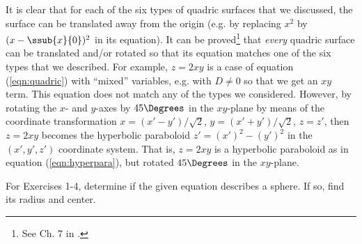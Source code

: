It is clear that for each of the six types of quadric surfaces that we discussed, the surface can be translated away
from the origin (e.g. by replacing $x^2$ by $(x - \ssub{x}{0})^2$ in its equation). It can be proved\footnote{See
Ch. 7 in \cite{pog}.}
that \emph{every}
quadric surface can be translated and/or rotated so that its equation matches one of the six types that we described.
For example, $z = 2xy$ is a case of equation (\ref{eqn:quadric}) with ``mixed'' variables, e.g. with $D \ne 0$ so
that we get an $xy$ term. This equation does not match any of the types we considered. However, by rotating the $x$-
and $y$-axes by $45\Degrees$ in the $xy$-plane by means of the coordinate transformation
$x = (x' - y')/\sqrt{2}$, $y = (x' + y')/\sqrt{2}$, $z = z'$, then $z = 2xy$ becomes
the hyperbolic paraboloid $z' = (x')^2 - (y')^2$ in the $(x',y',z')$ coordinate system. That is, $z = 2xy$ is a
hyperbolic paraboloid as in equation (\ref{eqn:hyperpara}), but rotated $45\Degrees$ in the $xy$-plane.
\newpage
\centerline{}\label{ssec1dot6}
\par\noindent For Exercises 1-4, determine if the given equation describes a sphere. If so, find its radius and
center.
